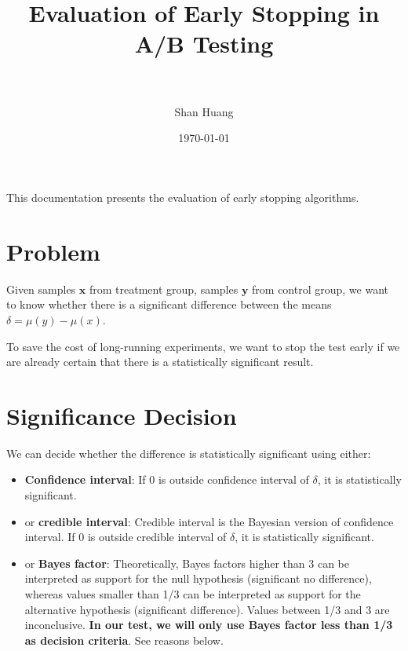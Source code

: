 \documentclass[paper=a4, fontsize=11pt]{scrartcl} %
\title{	
\normalfont \normalsize 
\textsc{} \\ [25pt] %
\horrule{0.5pt} \\[0.4cm] %
\huge Evaluation of Early Stopping in A/B Testing  \\ %
\horrule{2pt} \\[0.5cm] %
}
\author{Shan Huang} %
\date{\normalsize\today} %
\numberwithin{equation}{section} %
\numberwithin{figure}{section} %
\numberwithin{table}{section} %
\begin{document}
\maketitle %


This documentation presents the evaluation of early stopping algorithms. 

\section{Problem}
Given samples $\textbf{x}$ from treatment group, samples $\textbf{y}$ from control group, we want to know whether there is a significant difference between the means $\delta = \mu(y)-\mu(x)$.

To save the cost of long-running experiments, we want to stop the test early if we are already certain that there is a statistically significant result.

\section{Significance Decision}
\label{sec:byt}
We can decide whether the difference is statistically significant using either:

\begin{itemize}[noitemsep]
\item \textbf{Confidence interval}: If 0 is outside confidence interval of $\delta$, it is statistically significant.
\item or \textbf{credible interval}: Credible interval is the Bayesian version of confidence interval. If 0 is outside credible interval of $\delta$, it is statistically significant.
\item or \textbf{Bayes factor}: Theoretically, Bayes factors higher than 3 can be interpreted as support for the null hypothesis (significant no difference), whereas values smaller than 1/3 can be interpreted as support for the alternative hypothesis (significant difference). Values between 1/3 and 3 are inconclusive. \textbf{In our test, we will only use Bayes factor less than 1/3 as decision criteria}. See reasons below.
\end{itemize}
\end{document}
